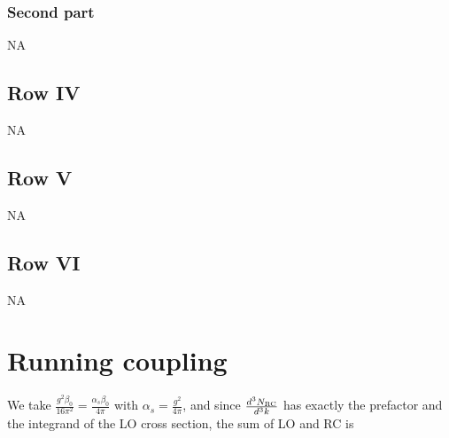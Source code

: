 \documentclass[9pt]{article}
\numberwithin{equation}{section}
\begin{document}
\subsubsection{Second part}
\textsc{NA}
\subsection{Row IV}
\textsc{NA}
\subsection{Row V}
\textsc{NA}
\subsection{Row VI}
\textsc{NA}
\section{Running coupling}
We take $\frac{g^{2}\beta_{0}}{16\pi^{2}}=\frac{\alpha_{s}\beta_{0}}{4\pi}$ with $\alpha_{s}=\frac{g^{2}}{4\pi}$, and since $\frac{d^{3}N_{\rm RC}}{d^{3}k}$ has exactly the prefactor and the integrand of the LO cross section, the sum of LO and RC is
\end{document}
